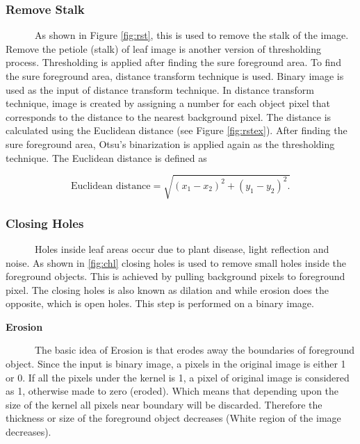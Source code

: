 \documentclass{article}
\begin{document}
\hypertarget{remove-stalk}{%
\subsubsection{Remove Stalk}\label{remove-stalk}}

~~~~~~As shown in Figure \ref{fig:rst}, this is used to remove the stalk
of the image. Remove the petiole (stalk) of leaf image is another
version of thresholding process. Thresholding is applied after finding
the sure foreground area. To find the sure foreground area, distance
transform technique is used. Binary image is used as the input of
distance transform technique. In distance transform technique, image is
created by assigning a number for each object pixel that corresponds to
the distance to the nearest background pixel. The distance is calculated
using the Euclidean distance (see Figure \ref{fig:rstex}). After finding
the sure foreground area, Otsu's binarization is applied again as the
thresholding technique. The Euclidean distance is defined as

\begin{equation}
    \text{Euclidean distance} = \sqrt{(x_1 - x_2)^2 + (y_1 - y_2)^2.}
    \label{eu}
\end{equation}

\hypertarget{closing-holes}{%
\subsubsection{Closing Holes}\label{closing-holes}}

~~~~~~Holes inside leaf areas occur due to plant disease, light
reflection and noise. As shown in \ref{fig:chl} closing holes is used to
remove small holes inside the foreground objects. This is achieved by
pulling background pixels to foreground pixel. The closing holes is also
known as dilation and while erosion does the opposite, which is open
holes. This step is performed on a binary image.

\textbf{Erosion}

~~~~~~The basic idea of Erosion is that erodes away the boundaries of
foreground object. Since the input is binary image, a pixels in the
original image is either 1 or 0. If all the pixels under the kernel is
1, a pixel of original image is considered as 1, otherwise made to zero
(eroded). Which means that depending upon the size of the kernel all
pixels near boundary will be discarded. Therefore the thickness or size
of the foreground object decreases (White region of the image
decreases).
\end{document}
